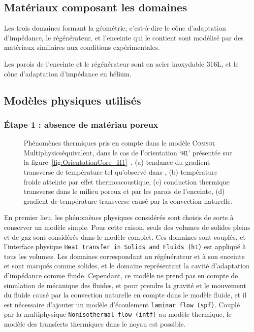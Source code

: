 \subsection{Matériaux composant les domaines}
Les trois domaines formant la géométrie, c'est-à-dire le cône d'adaptation d'impédance, le régénérateur, et l'enceinte qui le contient sont modélisé par des matériaux similaires aux conditions expérimentales. 

Les parois de l'enceinte et le régénérateur sont en acier inoxydable 316L, et le cône d'adaptation d'impédance en hélium.

\subsection{Modèles physiques utilisés}
\subsubsection{\'Etape 1 : absence de matériau poreux}
\begin{figure}[!ht]
    \centering
    
    \caption{Phénomènes thermiques pris en compte dans le modèle \textsc{Comsol} Multi\-physics\textss\textregistered équivalent, dans le cas de l'orientation `\texttt{H1}' présentée sur la figure~\ref{fig:OrientationCore_H1}--. (a) tendance du gradient transverse de température tel qu'observé dans \cite{ramadan_design_2021}, (b) température froide atteinte par effet thermoacoustique, (c) conduction thermique transverse dans le milieu poreux et par les parois de l'enceinte, (d) gradient de température transverse causé par la convection naturelle.}
    \label{fig:SuperpositionComsol}
\end{figure}

En premier lieu, les phénomènes physiques considérés sont choisis de sorte à conserver un modèle simple. Pour cette raison, seuls des volumes  de solides pleins et de gaz sont considérés dans le modèle complet. Ces domaines sont couplés, et l'interface physique \texttt{Heat transfer in Solids and Fluids (ht)} est appliqué à tous les volumes. Les domaines correspondant au régénérateur et à son enceinte et sont marqués comme solides, et le domaine représentant la cavité d'adaptation d'impédance comme fluide. Cependant, ce modèle ne prend pas en compte de simulation de mécanique des fluides, et pour prendre la gravité et le mouvement du fluide causé par la convection naturelle en compte dans le modèle fluide, et il est nécessaire d'ajouter un modèle d'écoulement \texttt{laminar flow (spf)}. Couplé par la multiphysique \texttt{Nonisothermal flow (intf)} au modèle thermique, le modèle des transferts thermiques dans le noyau est possible.   

